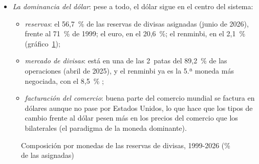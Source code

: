 \documentclass[11pt]{article}
\begin{document}
\begin{itemize}
\item \emph{La dominancia del dólar}: pese a todo, el dólar sigue en el centro del sistema:
  \begin{itemize}
  \item \emph{reservas}: el 56,7~\% de las reservas de divisas asignadas (junio de 2026), frente al 71~\% de 1999; el euro, en el 20,6~\%; el renminbi, en el 2,1~\% (gráfico~\ref{fig:reservas})\nocite{FMI2026COFER};
  \item \emph{mercado de divisas}: está en una de las 2~patas del 89,2~\% de las operaciones (abril de 2025), y el renminbi ya es la 5.ª moneda más negociada, con el 8,5~\%\nocite{BIS2025Trienal} ;
  \item \emph{facturación del comercio}: buena parte del comercio mundial se factura en dólares aunque no pase por Estados Unidos, lo que hace que los tipos de cambio frente al dólar pesen más en los precios del comercio que los bilaterales (el paradigma de la moneda dominante)\nocite{Gopinath2020DCP}.
  \end{itemize}
\end{itemize}

\begin{figure}[H]
\centering
\caption{Composición por monedas de las reservas de divisas, 1999-2026 (\% de las asignadas)}\label{fig:reservas}
\end{figure}
\end{document}
